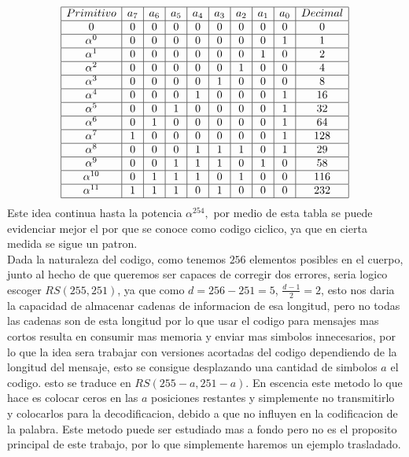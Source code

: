 $$\begin{array}{|c|c|c|c|c|c|c|c|c|c|}
\hline
   Primitivo& a_7 & a_6 & a_5 & a_4 & a_3 & a_2 & a_1 & a_0 & Decimal\\
   \hline
   0 & 0 & 0 & 0 & 0 & 0 & 0 & 0 & 0 & 0\\
   \hline
   \alpha^0 & 0 & 0 & 0 & 0 & 0 & 0 & 0 & 1 & 1 \\
   \hline
   \alpha^1 & 0 & 0 & 0 & 0 & 0 & 0 & 1 & 0 & 2 \\
   \hline
   \alpha^2 & 0 & 0 & 0 & 0 & 0 & 1 & 0 & 0 & 4 \\
   \hline
   \alpha^3 & 0 & 0 & 0 & 0 & 1 & 0 & 0 & 0 & 8 \\
   \hline
   \alpha^4 & 0 & 0 & 0 & 1 & 0 & 0 & 0 & 1 & 16 \\
   \hline
   \alpha^5 & 0 & 0 & 1 & 0 & 0 & 0 & 0 & 1 & 32\\
   \hline
   \alpha^6 & 0 & 1 & 0 & 0 & 0 & 0 & 0 & 1 & 64 \\
   \hline
   \alpha^7 & 1 & 0 & 0 & 0 & 0 & 0 & 0 & 1 & 128 \\
   \hline
   \alpha^8 & 0 & 0 & 0 & 1 & 1 & 1 & 0 & 1 & 29 \\
   \hline
   \alpha^9 & 0 & 0 & 1 & 1 & 1 & 0 & 1 & 0 & 58 \\
   \hline
   \alpha^{10} & 0 & 1 & 1 & 1 & 0 & 1 & 0 & 0 & 116 \\
   \hline
   \alpha^{11} & 1 & 1 & 1 & 0 & 1 & 0 & 0 & 0 & 232 \\
   \hline
\end{array}$$
Este idea continua hasta la potencia $\alpha^{254},$ por medio de esta tabla se puede evidenciar mejor el por que se conoce como codigo ciclico, ya que en cierta medida se sigue un patron.\\

Dada la naturaleza del codigo, como tenemos $256$ elementos posibles en el cuerpo, junto al hecho de que queremos ser capaces de corregir dos errores, seria logico escoger $RS(255,251)$, ya que como $d=256-251=5$, $\frac{d-1}{2}=2$, esto nos daria la capacidad de almacenar cadenas de informacion de esa longitud, pero no todas las cadenas son de esta longitud por lo que usar el codigo para mensajes mas cortos resulta en consumir mas memoria y enviar mas simbolos innecesarios, por lo que la idea sera trabajar con versiones acortadas del codigo dependiendo de la longitud del mensaje, esto se consigue desplazando una cantidad de simbolos $a$ el codigo. esto se traduce en $RS(255-a,251-a)$. En escencia este metodo lo que hace es colocar ceros en las $a$ posiciones restantes y simplemente no transmitirlo y colocarlos para la decodificacion, debido a que no influyen en la codificacion de la palabra. Este metodo puede ser estudiado mas a fondo pero no es el proposito principal de este trabajo, por lo que simplemente haremos un ejemplo trasladado.\\


